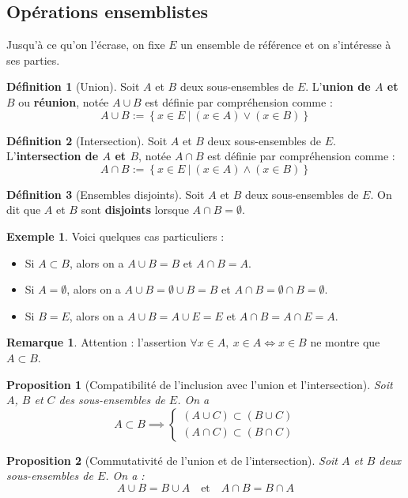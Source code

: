 \documentclass[french]{book}
\theoremstyle{plain}
\newtheorem{prop}{Proposition}[chapter]
\theoremstyle{definition}
\newtheorem{dfn}{Définition}[chapter]
\newtheorem{exa}{Exemple}[chapter]
\newtheorem{rmq}{Remarque}[chapter]
\theoremstyle{remark}
\begin{document}
\subsection{Opérations ensemblistes}
Jusqu'à ce qu'on l'écrase, on fixe $E$ un ensemble de référence et on s'intéresse à ses parties.
\begin{dfn}[Union]
	Soit $A$ et $B$ deux sous-ensembles de $E$. L'\textbf{union de $A$ et $B$} ou \textbf{réunion}, notée $A\cup B$ est définie par compréhension comme : $$A\cup B :=\left\{x\in E\ | \ (x\in A)\lor (x\in B)\right\}$$
\end{dfn}
\begin{dfn}[Intersection]
	Soit $A$ et $B$ deux sous-ensembles de $E$. L'\textbf{intersection de $A$ et $B$}, notée $A\cap B$ est définie par compréhension comme : $$A\cap B :=\left\{x\in E\ | \ (x\in A)\land (x\in B)\right\}$$
\end{dfn}
\begin{dfn}[Ensembles disjoints]
	Soit $A$ et $B$ deux sous-ensembles de $E$. On dit que $A$ et $B$ sont \textbf{disjoints} lorsque $A\cap B=\emptyset$.
\end{dfn}
\begin{exa}
	Voici quelques cas particuliers : 
	\begin{itemize}
		\item Si $A\subset B$, alors on a $A\cup B=B$ et $A\cap B=A$.
		\item Si $A=\emptyset$, alors on a $A\cup B=\emptyset\cup B=B$ et $A\cap B=\emptyset\cap B=\emptyset$.
		\item Si $B=E$, alors on a $A\cup B=A\cup E=E$ et $A\cap B=A\cap E=A$.
	\end{itemize}
\end{exa}
\begin{rmq}
	Attention : l'assertion $\forall x\in A,\ x\in A\iff x\in B$ ne montre que $A\subset B$.
\end{rmq}
\begin{prop}[Compatibilité de l'inclusion avec l'union et l'intersection]
	Soit $A$, $B$ et $C$ des sous-ensembles de $E$. On a $$A\subset B\implies \begin{cases}
		(A\cup C)\subset(B\cup C) \\
		(A\cap C)\subset(B\cap C)
	\end{cases}$$
\end{prop}
\begin{prop}[Commutativité de l'union et de l'intersection]
	Soit $A$ et $B$ deux sous-ensembles de $E$. On a : $$A\cup B=B\cup A \quad \text{et} \quad A\cap B=B\cap A$$
\end{prop}
\end{document}
